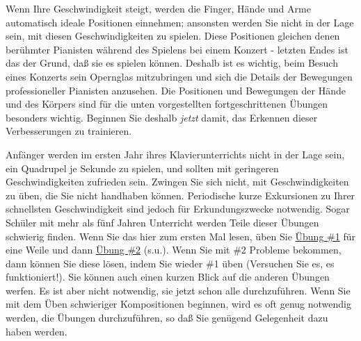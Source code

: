 Wenn Ihre Geschwindigkeit steigt, werden die Finger, Hände und Arme automatisch ideale Positionen einnehmen; ansonsten werden Sie nicht in der Lage sein, mit diesen Geschwindigkeiten zu spielen.
Diese Positionen gleichen denen berühmter Pianisten während des Spielens bei einem Konzert - letzten Endes ist das der Grund, daß sie es spielen können.
Deshalb ist es wichtig, beim Besuch eines Konzerts sein Opernglas mitzubringen und sich die Details der Bewegungen professioneller Pianisten anzusehen.
Die Positionen und Bewegungen der Hände und des Körpers sind für die unten vorgestellten fortgeschrittenen Übungen besonders wichtig.
Beginnen Sie deshalb \textit{jetzt} damit, das Erkennen dieser Verbesserungen zu trainieren.

Anfänger werden im ersten Jahr ihres Klavierunterrichts nicht in der Lage sein, ein Quadrupel je Sekunde zu spielen, und sollten mit geringeren Geschwindigkeiten zufrieden sein.
Zwingen Sie sich nicht, mit Geschwindigkeiten zu üben, die Sie nicht handhaben können.
Periodische kurze Exkursionen zu Ihrer schnellsten Geschwindigkeit sind jedoch für Erkundungszwecke notwendig.
Sogar Schüler mit mehr als fünf Jahren Unterricht werden Teile dieser Übungen schwierig finden.
Wenn Sie das hier zum ersten Mal lesen, üben Sie \hyperref[c1iii7b1]{Übung \#1} für eine Weile und dann \hyperref[c1iii7b2]{Übung \#2} (s.u.).
Wenn Sie mit \#2 Probleme bekommen, dann können Sie diese lösen, indem Sie wieder \#1 üben (Versuchen Sie es, es funktioniert!).
Sie können auch einen kurzen Blick auf die anderen Übungen werfen.
Es ist aber nicht notwendig, sie jetzt schon alle durchzuführen.
Wenn Sie mit dem Üben schwieriger Kompositionen beginnen, wird es oft genug notwendig werden, die Übungen durchzuführen, so daß Sie genügend Gelegenheit dazu haben werden.

